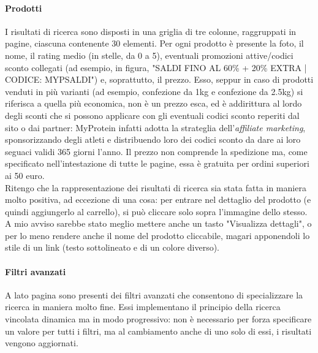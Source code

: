 \paragraph{Prodotti}
I risultati di ricerca sono disposti in una griglia di tre colonne, raggruppati in pagine, ciascuna contenente 30 elementi.
Per ogni prodotto è presente la foto, il nome, il rating medio (in stelle, da 0 a 5), eventuali promozioni attive/codici sconto collegati (ad esempio, in figura, "SALDI FINO AL 60\% + 20\% EXTRA | CODICE: MYPSALDI") e, soprattutto, il prezzo. Esso, seppur in caso di prodotti venduti in più varianti (ad esempio, confezione da 1kg e confezione da 2.5kg) si riferisca a quella più economica, non è un prezzo esca, ed è addirittura al lordo degli sconti che si possono applicare con gli eventuali codici sconto reperiti dal sito o dai partner: MyProtein infatti adotta la strateglia dell'\textit{affiliate marketing}, sponsorizzando degli atleti e distribuendo loro dei codici sconto da dare ai loro seguaci validi 365 giorni l'anno. Il prezzo non comprende la spedizione ma, come specificato nell'intestazione di tutte le pagine, essa è gratuita per ordini superiori ai 50 euro. \\
Ritengo che la rappresentazione dei risultati di ricerca sia stata fatta in maniera molto positiva, ad eccezione di una cosa: per entrare nel dettaglio del prodotto (e quindi aggiungerlo al carrello), si può cliccare solo sopra l'immagine dello stesso. A mio avviso sarebbe stato meglio mettere anche un tasto "Visualizza dettagli", o per lo meno rendere anche il nome del prodotto cliccabile, magari apponendoli lo stile di un link (testo sottolineato e di un colore diverso).

\paragraph{Filtri avanzati}
A lato pagina sono presenti dei filtri avanzati che consentono di specializzare la ricerca in maniera molto fine. Essi implementano il principio della ricerca vincolata dinamica ma in modo progressivo: non è necessario per forza specificare un valore per tutti i filtri, ma al cambiamento anche di uno solo di essi, i risultati vengono aggiornati.
